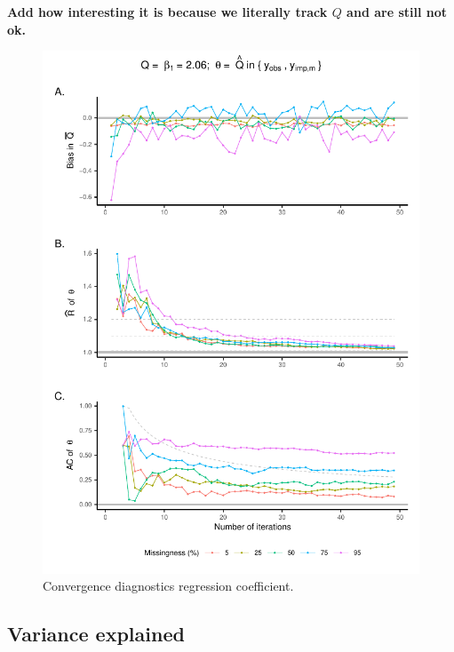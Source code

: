 \documentclass[Royal,times,sageh]{sagej}
\begin{document}
\textbf{Add how interesting it is because we literally track \(Q\) and
are still not ok.}

\begin{figure}

{\centering \includegraphics{manuscript_files/figure-latex/est-1} 

}

\caption{Convergence diagnostics regression coefficient.}\label{fig:est}
\end{figure}

\hypertarget{variance-explained}{%
\subsection{Variance explained}\label{variance-explained}}
\end{document}
